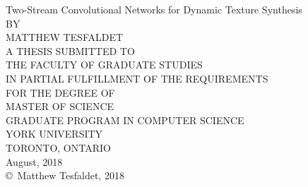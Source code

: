 \begin{titlepage}
	\thispagestyle{empty}
	\setcounter{page}{1}
	\centering
	{\LARGE Two-Stream Convolutional Networks for Dynamic Texture Synthesis\\}
	\vspace{4cm}
	BY\\
	\vspace{0.5cm}
	MATTHEW TESFALDET\\
	\vspace{2cm}
	A THESIS SUBMITTED TO\\
	THE FACULTY OF GRADUATE STUDIES\\
	IN PARTIAL FULFILLMENT OF THE REQUIREMENTS\\
	FOR THE DEGREE OF\\
	MASTER OF SCIENCE\\
	\vspace{1cm}
	GRADUATE PROGRAM IN COMPUTER SCIENCE\\
	YORK UNIVERSITY\\
	TORONTO, ONTARIO\\
	\vspace{1cm}
	August, 2018\\
	\vspace{1cm}
	\copyright \, Matthew Tesfaldet, 2018
\end{titlepage}